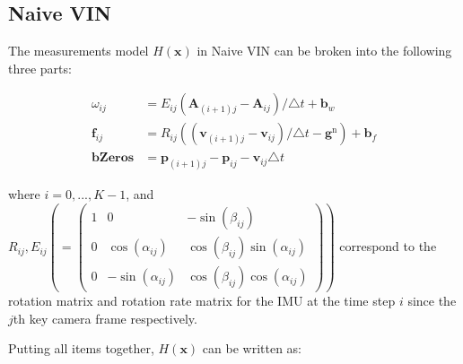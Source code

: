 \documentclass[12pt]{article}   %
\begin{document}
\begin{appendices}
\section{Naive VIN}
\label{apn:naiveVin}
The measurements model $H(\textbf{x})$ in Naive VIN can be broken into the following three parts:

\begin{align}
\omega_{ij} &= E_{ij} (\textbf{A}_{(i+1)j} - \textbf{A}_{ij})/\triangle t + \textbf{b}_w \\
\textbf{f}_{ij} &= R_{ij} ((\textbf{v}_{(i+1)j} - \textbf{v}_{ij}) / \triangle t - \textbf{g}^{\mathrm{n}}) + \textbf{b}_f \\
\textbf{bZeros} &= \textbf{p}_{(i+1)j} - \textbf{p}_{ij} - \textbf{v}_{ij} \triangle t
\end{align}

where $i = 0,..., K-1$, and $R_{ij}, E_{ij} ( = \begin{pmatrix} 1 & 0 & -\sin(\beta_{ij}) \\ 0 & \cos(\alpha_{ij}) & \cos(\beta_{ij})\sin(\alpha_{ij}) \\ 0 & -\sin(\alpha_{ij}) & \cos(\beta_{ij})\cos(\alpha_{ij}) \end{pmatrix}) $ correspond to the rotation matrix and rotation rate matrix for the IMU at the time step $i$ since the $j$th key camera frame respectively.

Putting all items together, $H(\textbf{x})$ can be written as:


\end{appendices}
\end{document}
